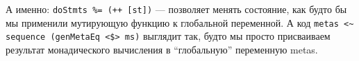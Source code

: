 А именно: \lstinline{doStmts %= (++ [st])} --- позволяет менять состояние, как будто бы мы применили мутирующую функцию к глобальной переменной. А код \lstinline{metas <~ sequence (genMetaEq <$> ms)} выглядит так, будто мы просто присваиваем результат монадического вычисления в ``глобальную'' переменную metas.











